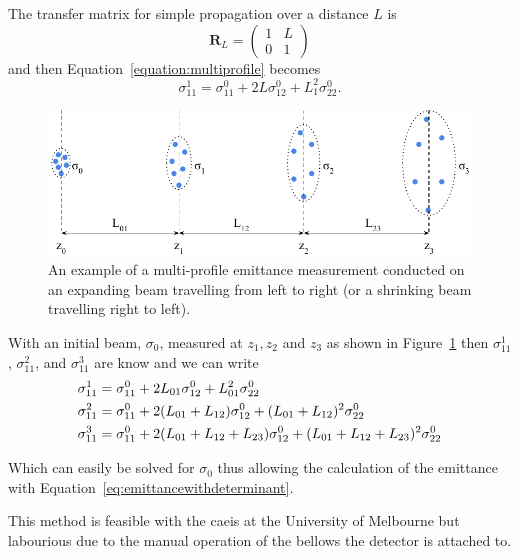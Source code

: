 The transfer matrix for simple propagation over a distance $L$ is
\begin{equation}
\mathbf{R}_L = \begin{pmatrix}1 & L \\ 0 & 1\end{pmatrix}
\end{equation}
and then Equation~\ref{equation:multiprofile} becomes
\begin{equation}
\sigma_{11}^1 = \sigma_{11}^0 + 2L \sigma_{12}^0 + L_1^2\sigma_{22}^0.
\end{equation}

\begin{figure}
\center
\includegraphics{part2/Figs/Multi-ProfileEmittance.pdf}
\caption{An example of a multi-profile emittance measurement conducted on an expanding beam travelling from left to right (or a shrinking beam travelling right to left).}
\label{figure:multiprofileexample}
\end{figure}

With an initial beam, $\sigma_0$, measured at $z_1, z_2$ and $z_3$ as shown in Figure~\ref{figure:multiprofileexample} then $\sigma_{11}^1$, $\sigma_{11}^2$, and $\sigma_{11}^3$ are know and we can write 
\begin{align}
\sigma_{11}^1 &= \sigma_{11}^0 +2L_{01}\sigma_{12}^0 + L_{01}^2\sigma_{22}^0 \notag\\
\sigma_{11}^2&= \sigma_{11}^0+2(L_{01}+L_{12})\sigma_{12}^0 + (L_{01}+L_{12})^2\sigma_{22}^0 \notag\\
\sigma_{11}^3&= \sigma_{11}^0+2(L_{01}+L_{12}+L_{23})\sigma_{12}^0 + (L_{01}+L_{12}+L_{23})^2\sigma_{22}^0 \label{eq:multiprofilesolution}
\end{align}

Which can easily be solved for $\sigma_0$ thus allowing the calculation of the emittance with Equation~\ref{eq:emittancewithdeterminant}.

This method is feasible with the \gls{caeis} at the University of Melbourne but labourious due to the manual operation of the bellows the detector is attached to.

